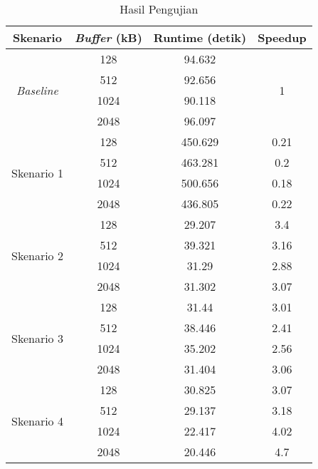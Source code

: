 \begin {table}[h]
\begin{center}
\caption {Hasil Pengujian}

    \begin{tabular}{|c|c|c|c|}

    \hline
    \rowcolor{gray!10}
    Skenario & \emph{Buffer} (kB) & Runtime (detik) & Speedup \\
    \hline

    \multirow{4}{*}{\emph{Baseline}} & 128 & 94.632 & \multirow{4}{*}{1} \\
    \cline{2-3}
    & 512 & 92.656 & \\
    \cline{2-3}
    & 1024 & 90.118 & \\
    \cline{2-3}
    & 2048 & 96.097 & \\
    \hline
    
    \multirow{4}{*}{Skenario 1} & 128 & 450.629 & 0.21 \\
    \cline{2-4}
    & 512 & 463.281 & 0.2 \\
    \cline{2-4}
    & 1024 & 500.656 & 0.18 \\
    \cline{2-4}
    & 2048 & 436.805 & 0.22 \\
    \hline
    
    \multirow{4}{*}{Skenario 2} & 128 & 29.207 & 3.4 \\
    \cline{2-4}
    & 512 & 39.321 & 3.16 \\
    \cline{2-4}
    & 1024 & 31.29 & 2.88 \\
    \cline{2-4}
    & 2048 & 31.302 & 3.07 \\
    \hline
    
    \multirow{4}{*}{Skenario 3} & 128 & 31.44 & 3.01 \\
    \cline{2-4}
    & 512 & 38.446 & 2.41 \\
    \cline{2-4}
    & 1024 & 35.202 & 2.56 \\
    \cline{2-4}
    & 2048 & 31.404 & 3.06 \\
    \hline

    \multirow{4}{*}{Skenario 4} & 128 & 30.825 & 3.07 \\
    \cline{2-4}
    & 512 & 29.137 & 3.18 \\
    \cline{2-4}
    & 1024 & 22.417 & 4.02 \\
    \cline{2-4}
    & 2048 & 20.446 & 4.7 \\
    \hline

    \end{tabular}

\end{center}
\end{table}

